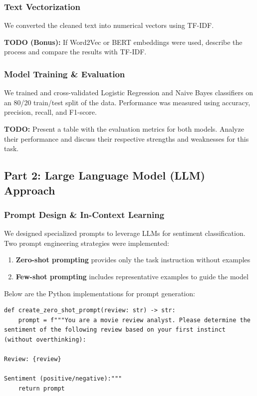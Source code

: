 \documentclass{article}
\begin{document}
\subsubsection{Text Vectorization}
\label{sssec:vectorization}
We converted the cleaned text into numerical vectors using TF-IDF.

\textbf{TODO (Bonus):} If Word2Vec or BERT embeddings were used, describe the process and compare the results with TF-IDF.

\subsubsection{Model Training \& Evaluation}
\label{sssec:ml_training}
We trained and cross-validated Logistic Regression and Naive Bayes classifiers on an 80/20 train/test split of the data. Performance was measured using accuracy, precision, recall, and F1-score.

\textbf{TODO:} Present a table with the evaluation metrics for both models. Analyze their performance and discuss their respective strengths and weaknesses for this task.

\subsection{Part 2: Large Language Model (LLM) Approach}
\label{ssec:llm_approach}

\subsubsection{Prompt Design \& In-Context Learning}
\label{sssec:prompt_design}

We designed specialized prompts to leverage LLMs for sentiment classification. Two prompt engineering strategies were implemented:

\begin{enumerate}
    \item \textbf{Zero-shot prompting} provides only the task instruction without examples
    \item \textbf{Few-shot prompting} includes representative examples to guide the model
\end{enumerate}

Below are the Python implementations for prompt generation:

\begin{lstlisting}[caption={Zero-shot prompt design}]
def create_zero_shot_prompt(review: str) -> str:
    prompt = f"""You are a movie review analyst. Please determine the sentiment of the following review based on your first instinct (without overthinking):

Review: {review}

Sentiment (positive/negative):"""
    return prompt
\end{lstlisting}
\end{document}
